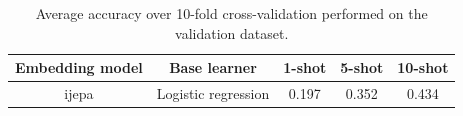 \begin{table}[ht!]
\centering
\begin{tabular}{ c c c c c }
	\hline
	\textbf{Embedding model} & \textbf{Base learner} & \textbf{1-shot} & \textbf{5-shot} & \textbf{10-shot} \\
	\hline
	\gls{ijepa} & Logistic regression & 0.197 & 0.352 & 0.434 \\
	\hline
\end{tabular}
\caption{Average accuracy over 10-fold cross-validation performed on the validation dataset.}
\label{table:test}
\end{table}

